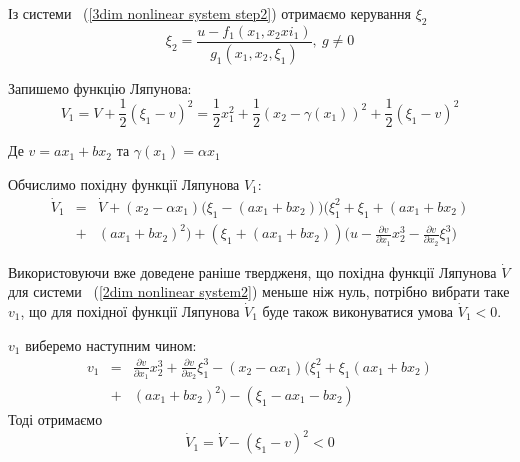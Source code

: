 \documentclass{article}
\begin{document}
Із системи ~(\ref{3dim nonlinear system step2}) отримаємо керування $\xi_2$ 
\begin{equation}
    \xi_2 = \frac{u-f_1(x_1,x_2xi_1)}{g_1(x_1,x_2,\xi_{1})}, ~g \neq 0
\end{equation}

Запишемо функцію Ляпунова:
\begin{equation}
    V_1 = V+\frac{1}{2}(\xi_1-v)^2=\frac{1}{2}x_1^2+\frac{1}{2}(x_2-\gamma(x_1))^2+
    \frac{1}{2}(\xi_1-v)^2
\end{equation}

Де $v = ax_1+bx_2$ та $\gamma(x_1) = \alpha x_1$

Обчислимо похідну функції Ляпунова $V_1$:
\begin{eqnarray}
    \dot V_1 &=& \dot V + (x_2-\alpha x_1) \Big( \xi_1-(ax_1+bx_2) \Big)
    \Big( \xi_1^2+\xi_1+(ax_1+bx_2) \nonumber \\ &+&(ax_1+bx_2)^2 \Big)
    +(\xi_1+(ax_1+bx_2))
    \Big(u-\frac{\partial v}{\partial x_1}x_{2}^3 
    - \frac{\partial v}{\partial x_2}\xi_{1}^3 \Big)
\end{eqnarray}

Використовуючи вже доведене раніше твердженя, що похідна функції Ляпунова $\dot V$ для системи
 ~(\ref{2dim nonlinear system2})  меньше ніж нуль, потрібно вибрати таке $v_1$, що для похідної функції
Ляпунова $\dot V_1$ буде також виконуватися умова $\dot V_1 < 0$.

$v_1$ виберемо наступним чином:
\begin{eqnarray}
    v_1 &=& \frac{\partial v}{\partial x_1}x_{2}^3 + \frac{\partial v}{\partial x_2}\xi_{1}^3
    - (x_2 -\alpha x_1) \Big(\xi_1^2 + \xi_1(ax_1 + bx_2) \nonumber \\ 
    &+& (ax_1+bx_2)^2 \Big) -(\xi_1 - ax_1-bx_2)
\end{eqnarray}
Тоді отримаємо
\begin{equation}
    \dot V_1 = \dot V - (\xi_1 - v)^2<0
\end{equation}
\end{document}
